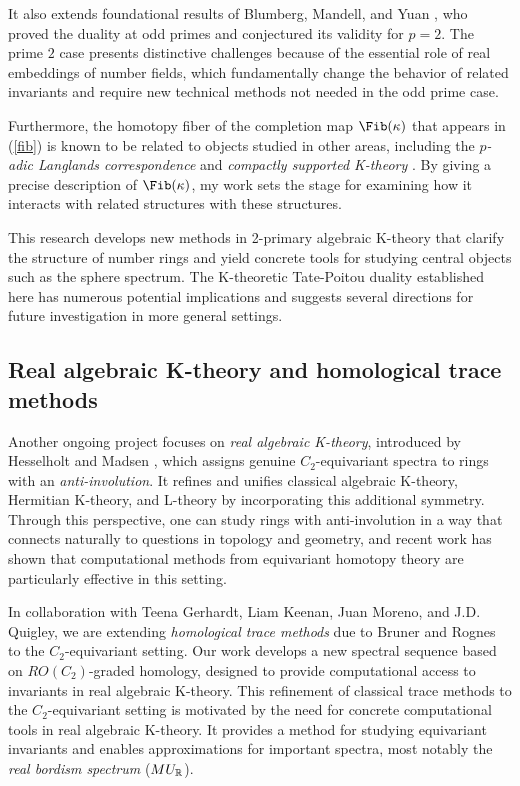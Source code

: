 \documentclass[11pt]{article}
\begin{document}
It also extends foundational results of Blumberg, Mandell, and Yuan \cite{MR4121155,BMY}, who proved the duality at odd primes and conjectured its validity for $p=2$. The prime $2$ case presents distinctive challenges because of the essential role of real embeddings of number fields, which fundamentally change the behavior of related invariants and require new technical methods not needed in the odd prime case.

Furthermore, the homotopy fiber of the completion map $\Fib(\ka)$ that appears in (\ref{fib}) is known to be related to objects studied in other areas, including the {\it $p$-adic Langlands correspondence} \cite{MR2905536} and {\it compactly supported K-theory} \cite{MR3211458}. 
By giving a precise description of $\Fib(\ka)$, my work sets the stage for examining how it interacts with related structures with these structures.

This research develops new methods in 2-primary algebraic K-theory that clarify the structure of number rings and yield concrete tools for studying central objects such as the sphere spectrum.
The K-theoretic Tate-Poitou duality established here has numerous potential implications and suggests several directions for future investigation in more general settings.

\subsection{Real algebraic K-theory and homological trace methods}
Another ongoing project focuses on {\it real algebraic K-theory}, introduced by Hesselholt and Madsen \cite{HMreal}, which assigns genuine $C_2$-equivariant spectra to rings with an {\it anti-involution}.
It refines and unifies classical algebraic K-theory, Hermitian K-theory, and L-theory by incorporating this additional symmetry.
Through this perspective, one can study rings with anti-involution in a way that connects naturally to questions in topology and geometry, and recent work has shown that computational methods from equivariant homotopy theory are particularly effective in this setting.

In collaboration with Teena Gerhardt, Liam Keenan, Juan Moreno, and J.D. Quigley, we are extending {\it homological trace methods} due to Bruner and Rognes \cite{MR2153113} to the $C_2$-equivariant setting. 
Our work develops a new spectral sequence based on $RO(C_2)$-graded homology, designed to provide computational access to invariants in real algebraic K-theory. 
This refinement of classical trace methods to the $C_2$-equivariant setting is motivated by the need for concrete computational tools in real algebraic K-theory. It provides a method for studying equivariant invariants and enables approximations for important spectra, most notably the {\it real bordism spectrum} ($MU_{\mathbb{R}}$).
\end{document}
